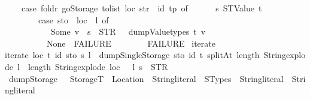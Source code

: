\begin{isabellebody}
\ \ \ \ {\isacharparenleft}{\kern0pt}case\ foldr\ go\isactrlsub S\isactrlsub t\isactrlsub o\isactrlsub r\isactrlsub a\isactrlsub g\isactrlsub e\ {\isacharparenleft}{\kern0pt}tolist\ loc{\isacharparenright}{\kern0pt}\ {\isacharparenleft}{\kern0pt}str\ {\isacharplus}{\kern0pt}\ id{\isacharprime}{\kern0pt}{\isacharcomma}{\kern0pt}\ tp{\isacharparenright}{\kern0pt}\ of\isanewline
\ \ \ \ \ \ {\isacharparenleft}{\kern0pt}s{\isacharcomma}{\kern0pt}\ STValue\ t{\isacharparenright}{\kern0pt}\ {\isasymRightarrow}\isanewline
\ \ \ \ \ \ \ \ {\isacharparenleft}{\kern0pt}case\ sto\ {\isachardollar}{\kern0pt}{\isachardollar}{\kern0pt}\ {\isacharparenleft}{\kern0pt}loc\ {\isacharplus}{\kern0pt}\ l{\isacharparenright}{\kern0pt}\ of\isanewline
\ \ \ \ \ \ \ \ \ \ \ Some\ v\ {\isasymRightarrow}\ s\ {\isacharplus}{\kern0pt}\ {\isacharparenleft}{\kern0pt}STR\ {\isacharprime}{\kern0pt}{\isacharprime}{\kern0pt}{\isacharequal}{\kern0pt}{\isacharequal}{\kern0pt}{\isacharprime}{\kern0pt}{\isacharprime}{\kern0pt}{\isacharparenright}{\kern0pt}\ {\isacharplus}{\kern0pt}\ dump\isactrlsub V\isactrlsub a\isactrlsub l\isactrlsub u\isactrlsub e\isactrlsub t\isactrlsub y\isactrlsub p\isactrlsub e\isactrlsub s\ t\ v\isanewline
\ \ \ \ \ \ \ \ \ {\isacharbar}{\kern0pt}\ None\ {\isasymRightarrow}\ FAILURE{\isacharparenright}{\kern0pt}\isanewline
\ \ \ \ \ {\isacharbar}{\kern0pt}\ {\isacharunderscore}{\kern0pt}\ {\isasymRightarrow}\ FAILURE{\isacharparenright}{\kern0pt}{\isachardoublequoteclose}\isanewline
\isanewline
{}\isamarkupfalse%
\ iterate\ \isanewline
{\isachardoublequoteopen}iterate\ loc\ t\ id{\isacharprime}{\kern0pt}\ sto\ s\ l\ {\isacharequal}{\kern0pt}\ dumpSingle\isactrlsub S\isactrlsub t\isactrlsub o\isactrlsub r\isactrlsub a\isactrlsub g\isactrlsub e\ sto\ id{\isacharprime}{\kern0pt}\ t\ {\isacharparenleft}{\kern0pt}splitAt\ {\isacharparenleft}{\kern0pt}length\ {\isacharparenleft}{\kern0pt}String{\isachardot}{\kern0pt}explode\ l{\isacharparenright}{\kern0pt}\ {\isacharminus}{\kern0pt}\ length\ {\isacharparenleft}{\kern0pt}String{\isachardot}{\kern0pt}explode\ loc{\isacharparenright}{\kern0pt}\ {\isacharminus}{\kern0pt}\ {}{\isacharparenright}{\kern0pt}\ l{\isacharparenright}{\kern0pt}\ s\ {\isacharplus}{\kern0pt}\ {\isacharparenleft}{\kern0pt}STR\ {\isacharprime}{\kern0pt}{\isacharprime}{\kern0pt}{\isasymnewline}{\isacharprime}{\kern0pt}{\isacharprime}{\kern0pt}{\isacharparenright}{\kern0pt}{\isachardoublequoteclose}\isanewline
\isanewline
{}\isamarkupfalse%
\ dump\isactrlsub S\isactrlsub t\isactrlsub o\isactrlsub r\isactrlsub a\isactrlsub g\isactrlsub e\ {\isacharcolon}{\kern0pt}{\isacharcolon}{\kern0pt}\ \ {\isachardoublequoteopen}StorageT\ {\isasymRightarrow}\ Location\ {\isasymRightarrow}\ String{\isachardot}{\kern0pt}literal\ {\isasymRightarrow}\ STypes\ {\isasymRightarrow}\ String{\isachardot}{\kern0pt}literal\ {\isasymRightarrow}\ String{\isachardot}{\kern0pt}literal{\isachardoublequoteclose}\ \isanewline

\end{isabellebody}
